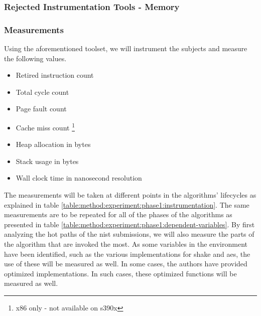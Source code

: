 \subsubsection{Rejected Instrumentation Tools - Memory}
\label{section:method:experiment:phase1:rejected-toolset-memory}

\subsubsection{Measurements}
\label{section:method:experiment:phase1:measurements}


Using the aforementioned toolset, we will instrument the subjects and measure the following values.

\begin{itemize}
    \item Retired instruction count
    \item Total cycle count
    \item Page fault count
    \item Cache miss count \footnote{x86 only - not available on s390x}
    \item Heap allocation in bytes
    \item Stack usage in bytes
    \item Wall clock time in nanosecond resolution
\end{itemize}

The measurements will be taken at different points in the algorithms' lifecycles as explained in table \ref{table:method:experiment:phase1:instrumentation}. The same measurements are to be repeated for all of the phases of the algorithms as presented in table \ref{table:method:experiment:phase1:dependent-variables}. By first analyzing the hot paths of the \gls{nist} submissions, we will also measure the parts of the algorithm that are invoked the most. As some variables in the environment have been identified, such as the various implementations for \gls{shake} and \gls{aes}, the use of these will be measured as well. In some cases, the authors have provided optimized implementations. In such cases, these optimized functions will be measured as well.

